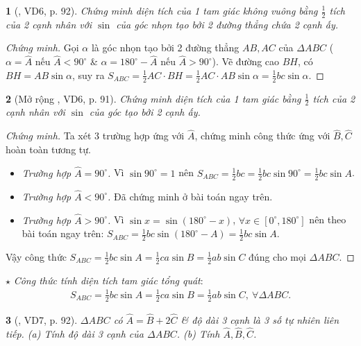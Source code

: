 \documentclass{article}
\newtheorem{baitoan}{}
\begin{document}
\begin{baitoan}[\cite{Binh_Toan_9_tap_1}, VD6, p. 92]
	Chứng minh diện tích của 1 tam giác không vuông bằng $\frac{1}{2}$ tích của 2 cạnh nhân với $\sin$ của góc nhọn tạo bởi 2 đường thẳng chứa 2 cạnh ấy.
\end{baitoan}

\begin{proof}[Chứng minh]
	Gọi $\alpha$ là góc nhọn tạo bởi 2 đường thẳng $AB,AC$ của $\Delta ABC$ ($\alpha = \widehat{A}$ nếu $\widehat{A} < 90^\circ$ \& $\alpha = 180^\circ - \widehat{A}$ nếu $\widehat{A} > 90^\circ$). Vẽ đường cao $BH$, có $BH = AB\sin\alpha$, suy ra $S_{ABC} = \frac{1}{2}AC\cdot BH = \frac{1}{2}AC\cdot AB\sin\alpha = \frac{1}{2}bc\sin\alpha$.
\end{proof}

\begin{baitoan}[Mở rộng \cite{Binh_Toan_9_tap_1}, VD6, p. 91]
	Chứng minh diện tích của 1 tam giác bằng $\frac{1}{2}$ tích của 2 cạnh nhân với $\sin$ của góc tạo bởi 2 cạnh ấy.
\end{baitoan}

\begin{proof}[Chứng minh]
	Ta xét 3 trường hợp ứng với $\widehat{A}$, chứng minh công thức ứng với $\widehat{B},\widehat{C}$ hoàn toàn tương tự.
	\begin{itemize}
		\item \textit{Trường hợp $\widehat{A} = 90^\circ$.} Vì $\sin90^\circ = 1$ nên $S_{ABC} = \frac{1}{2}bc = \frac{1}{2}bc\sin90^\circ = \frac{1}{2}bc\sin A$.
		\item \textit{Trường hợp $\widehat{A} < 90^\circ$.} Đã chứng minh ở bài toán ngay trên.
		\item \textit{Trường hợp $\widehat{A} > 90^\circ$.} Vì $\sin x = \sin(180^\circ - x)$, $\forall x\in[0^\circ,180^\circ]$ nên theo bài toán ngay trên: $S_{ABC} = \frac{1}{2}bc\sin(180^\circ - A) = \frac{1}{2}bc\sin A$.
	\end{itemize}
	Vậy công thức $S_{ABC} = \frac{1}{2}bc\sin A = \frac{1}{2}ca\sin B = \frac{1}{2}ab\sin C$ đúng cho mọi $\Delta ABC$.
\end{proof}
\noindent$\star$ \textit{Công thức tính diện tích tam giác tổng quát}:
\begin{align*}
	\boxed{S_{ABC} = \frac{1}{2}bc\sin A = \frac{1}{2}ca\sin B = \frac{1}{2}ab\sin C,\ \forall\Delta ABC.}
\end{align*}

\begin{baitoan}[\cite{Binh_Toan_9_tap_1}, VD7, p. 92]
	$\Delta ABC$ có $\widehat{A} = \widehat{B} + 2\widehat{C}$ \& độ dài 3 cạnh là 3 số tự nhiên liên tiếp. (a) Tính độ dài 3 cạnh của $\Delta ABC$. (b) Tính $\widehat{A},\widehat{B},\widehat{C}$.
\end{baitoan}
\end{document}
